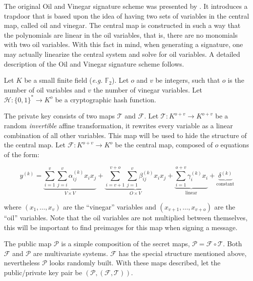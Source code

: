 \documentclass{ufsctex/ufsctex}
\begin{document}
The original Oil and Vinegar signature scheme was presented by
\cite{patarin1997ov}. It introduces a trapdoor that is based upon the idea of
having two sets of variables in the central map, called oil and vinegar. The
central map is constructed in such a way that the polynomials are linear in the
oil variables, that is, there are no monomials with two oil variables. With
this fact in mind, when generating a signature, one may actually linearize the
central system and solve for oil variables. A detailed description of the Oil
and Vinegar signature scheme follows.

Let $K$ be a small finite field (\textit{e.g.} $\mathbb{F}_2$). Let $o$ and $v$
be integers, such that $o$ is the number of oil variables and $v$ the number of
vinegar variables. Let $\mathcal{H}: \{0,1\}^* \to K^o$ be a cryptographic hash
function.

The private key consists of two maps $\mathcal{T}$ and $\mathcal{F}$. Let
$\mathcal{T}: K^{o+v} \to K^{o+v}$ be a random \textit{invertible} affine
transformation, it rewrites every variable as a linear combination of all other
variables. This map will be used to hide the structure of the central map. Let
$\mathcal{F}: K^{o+v} \to K^{o}$ be the central map, composed of $o$ equations
of the form:

\begin{equation}\label{eq:ovpolynomial}
y^{(k)} =
\underbrace{\sum_{i=1}^{v}\sum_{j=i}^{v} \alpha^{(k)}_{ij} x_i x_j}_{
V \times V} +
\underbrace{\sum_{i=v+1}^{v+o}\sum_{j=1}^{v} \beta^{(k)}_{ij} x_i x_j}_{
O \times V} +
\underbrace{\sum_{i=1}^{o+v} \gamma^{(k)}_{i} x_i}_{\text{linear}} +
\underbrace{\delta^{(k)}}_{\text{constant}}
\end{equation}

where $(x_1,\dots,x_v)$ are the ``vinegar'' variables and
$(x_{v+1},\dots,x_{v+o})$ are the ``oil'' variables. Note that the oil
variables are not multiplied between themselves, this will be important to find
preimages for this map when signing a message.

The public map $\mathcal{P}$ is a simple composition of the secret maps,
$\mathcal{P} = \mathcal{F} \circ \mathcal{T}$. Both $\mathcal{F}$ and
$\mathcal{P}$ are multivariate systems. $\mathcal{F}$ has the special structure
mentioned above, nevertheless $\mathcal{P}$ looks randomly built. With these
maps described, let the public/private key pair be
$(\mathcal{P},(\mathcal{F},\mathcal{T}))$.
\end{document}
